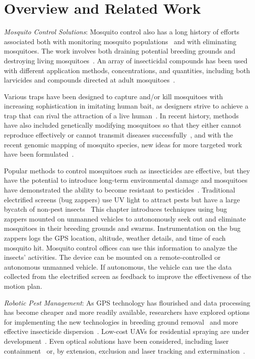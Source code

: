 \section[Overview and Related Work]{Overview and Related Work}

\noindent  \emph{Mosquito Control Solutions}:
Mosquito control also has a long history of efforts associated both with monitoring mosquito populations~\cite{dennett2007associations} and with eliminating mosquitoes.
The work involves both draining potential breeding grounds and destroying living mosquitoes~\cite{peter2005tick}.
An array of insecticidal compounds has been used with different application methods, concentrations, and quantities, including both larvicides and compounds directed at adult mosquitoes~\cite{larvicides2005guidelines}.

Various traps have been designed to capture and/or kill mosquitoes with increasing sophistication in imitating human bait, as designers strive to achieve a trap that can rival the attraction of a live human~\cite{maliti2015development}.
In recent history, methods have also included genetically modifying mosquitoes so that they either cannot reproduce effectively or cannot transmit diseases successfully~\cite{marshall2009malaria}, and with the recent genomic mapping of mosquito species, new ideas for more targeted work have been formulated~\cite{hill2005arthropod}.

Popular methods to control mosquitoes such as insecticides are effective, but they have the potential to introduce long-term environmental damage and mosquitoes have demonstrated the ability to become resistant to pesticides~\cite{ndiath2012resistance}.
Traditional electrified screens (bug zappers) use UV light to attract pests but have a large bycatch of non-pest insects~\cite{University-Of-Florida1997}
This chapter introduces techniques using bug zappers mounted on unmanned vehicles to autonomously seek out and eliminate mosquitoes in their breeding grounds and swarms.
Instrumentation on the bug zappers logs the GPS location, altitude, weather details, and time of each mosquito hit.
Mosquito control offices can use this information to analyze the insects' activities.
The device can be mounted on a remote-controlled or autonomous unmanned vehicle.
If autonomous, the vehicle can use the data collected from the electrified screen as feedback to improve the effectiveness of the motion plan. 
	
\noindent  \emph{Robotic Pest Management}:
As GPS technology has flourished and data processing has become cheaper and more readily available, researchers have explored options for implementing the new technologies in breeding ground removal~\cite{anupa2014identification} and more effective insecticide dispersion~\cite{hur2015low}.  Low-cost UAVs for residential spraying are under development~\cite{amenyo2014medizdroids}.  Even optical solutions have been considered, including laser containment~\cite{boonsri2012laser} or, by extension, exclusion and laser tracking and extermination~\cite{kare2010build}.
    
